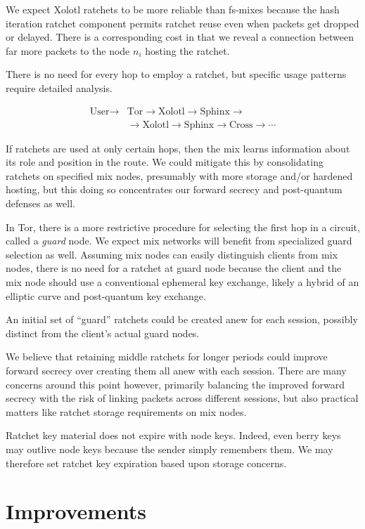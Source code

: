 \documentclass[twoside,letterpaper]{llncs}
\begin{document}
We expect Xolotl ratchets to be more reliable than fs-mixes because
the hash iteration ratchet component permits ratchet reuse even when
packets get dropped or delayed.  There is a corresponding cost in
that we reveal a connection between far more packets to the node
$n_i$ hosting the ratchet.

There is no need for every hop to employ a ratchet, %
but specific usage patterns require detailed analysis.

\[ \begin{aligned}
\textrm{User} \to &\textrm{Tor} \to \textrm{Xolotl} \to \textrm{Sphinx} \to \\
\quad &\to \textrm{Xolotl} \to \textrm{Sphinx} \to \textrm{Cross} \to \cdots 
\end{aligned} \]

If ratchets are used at only certain hops, then the mix learns
information about its role and position in the route.  
We could mitigate this by consolidating ratchets on specified mix
nodes, presumably with more storage and/or hardened hosting, but
this doing so concentrates our forward secrecy and post-quantum 
defenses as well.

In Tor, there is a more restrictive procedure for selecting the
first hop in a circuit, called a {\it guard} node.  We expect
mix networks will benefit from specialized guard selection as well.
Assuming mix nodes can easily distinguish clients from mix nodes,
there is no need for a ratchet at guard node because the client and
the mix node should use a conventional ephemeral key exchange,
likely a hybrid of an elliptic curve and post-quantum key exchange.

An initial set of ``guard'' ratchets could be created anew for each
session, possibly distinct from the client's actual guard nodes.

We believe that retaining middle ratchets for longer periods could
improve forward secrecy over creating them all anew with each session. 
There are many concerns around this point however, primarily balancing
the improved forward secrecy with the risk of linking packets across
different sessions, but also
 practical matters like ratchet storage requirements on mix nodes.  

Ratchet key material does not expire with node keys.  Indeed, even
berry keys may outlive node keys because the sender simply remembers
them.  We may therefore set ratchet key expiration based upon storage
concerns. 


\section{Improvements}
\end{document}
